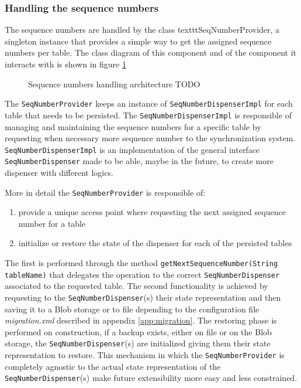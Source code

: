 \subsubsection{Handling the sequence numbers}
The sequence numbers are handled by the class texttt{SeqNumberProvider}, a singleton instance that provides a simple way to get the assigned sequence numbers per table.
\noindent The class diagram of this component and of the component it interacts with is shown in figure \ref{fig:seq-provider}

\begin{figure}[tbh]
  \centering
  \begin{minipage}[c][0.33\textheight][c]{0.5\textwidth}
  \end{minipage}
  \caption{Sequence numbers handling architecture TODO}
  \label{fig:seq-provider}
\end{figure} 

\noindent The \texttt{SeqNumberProvider} keeps an instance of \texttt{SeqNumberDispenserImpl} for each table that needs to be persisted. The \texttt{SeqNumberDispenserImpl} is responsible of managing and maintaining the sequence numbers for a specific table by requesting when necessary more sequence number to the synchronization system.
\texttt{SeqNumberDispenserImpl} is an implementation of the general interface \texttt{SeqNumberDispenser} made to be able, maybe in the future, to create more dispenser with different logics.

\noindent More in detail the \texttt{SeqNumberProvider} is responsible of:
\begin{enumerate}
\item provide a unique access point where requesting the next assigned sequence number for a table
\item initialize or restore the state of the dispenser for each of the persisted tables
\end{enumerate}
\noindent The first is performed through the method \texttt{getNextSequenceNumber(String tableName)} that delegates the operation to the correct \texttt{SeqNumberDispenser} associated to the requested table.
The second functionality is achieved by requesting to the \texttt{SeqNumberDispenser}(s) their state representation and then saving it to a Blob storage or to file depending to the configuration file \textit{migration.xml} described in appendix \ref{app:migration}. The restoring phase is performed on construction, if a backup exists, either on file or on the Blob storage, the \texttt{SeqNumberDispenser}(s) are initialized giving them their state representation to restore.
This mechanism in which the \texttt{SeqNumberProvider} is completely agnostic to the actual state representation of the \texttt{SeqNumberDispenser}(s) make future extensibility more easy and less constrained.

